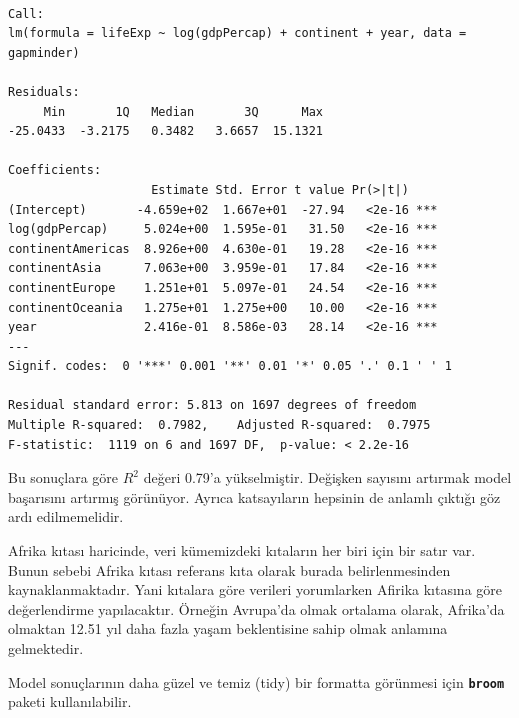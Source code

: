 \documentclass[
  letterpaper,
  DIV=11,
  numbers=noendperiod]{scrreprt}
\begin{document}
\begin{verbatim}

Call:
lm(formula = lifeExp ~ log(gdpPercap) + continent + year, data = gapminder)

Residuals:
     Min       1Q   Median       3Q      Max 
-25.0433  -3.2175   0.3482   3.6657  15.1321 

Coefficients:
                    Estimate Std. Error t value Pr(>|t|)    
(Intercept)       -4.659e+02  1.667e+01  -27.94   <2e-16 ***
log(gdpPercap)     5.024e+00  1.595e-01   31.50   <2e-16 ***
continentAmericas  8.926e+00  4.630e-01   19.28   <2e-16 ***
continentAsia      7.063e+00  3.959e-01   17.84   <2e-16 ***
continentEurope    1.251e+01  5.097e-01   24.54   <2e-16 ***
continentOceania   1.275e+01  1.275e+00   10.00   <2e-16 ***
year               2.416e-01  8.586e-03   28.14   <2e-16 ***
---
Signif. codes:  0 '***' 0.001 '**' 0.01 '*' 0.05 '.' 0.1 ' ' 1

Residual standard error: 5.813 on 1697 degrees of freedom
Multiple R-squared:  0.7982,    Adjusted R-squared:  0.7975 
F-statistic:  1119 on 6 and 1697 DF,  p-value: < 2.2e-16
\end{verbatim}

\begin{tcolorbox}[enhanced jigsaw, colback=white, coltitle=black, colbacktitle=quarto-callout-note-color!10!white, opacitybacktitle=0.6, opacityback=0, toprule=.15mm, bottomrule=.15mm, bottomtitle=1mm, rightrule=.15mm, breakable, arc=.35mm, colframe=quarto-callout-note-color-frame, titlerule=0mm, left=2mm, leftrule=.75mm, toptitle=1mm, title=\textcolor{quarto-callout-note-color}{\faInfo}\hspace{0.5em}{Yorum}]

Bu sonuçlara göre \(R^2\) değeri 0.79'a yükselmiştir. Değişken sayısını
artırmak model başarısını artırmış görünüyor. Ayrıca katsayıların
hepsinin de anlamlı çıktığı göz ardı edilmemelidir.

Afrika kıtası haricinde, veri kümemizdeki kıtaların her biri için bir
satır var. Bunun sebebi Afrika kıtası referans kıta olarak burada
belirlenmesinden kaynaklanmaktadır. Yani kıtalara göre verileri
yorumlarken Afirika kıtasına göre değerlendirme yapılacaktır. Örneğin
Avrupa'da olmak ortalama olarak, Afrika'da olmaktan 12.51 yıl daha fazla
yaşam beklentisine sahip olmak anlamına gelmektedir.

\end{tcolorbox}

\begin{tcolorbox}[enhanced jigsaw, colback=white, coltitle=black, colbacktitle=quarto-callout-tip-color!10!white, opacitybacktitle=0.6, opacityback=0, toprule=.15mm, bottomrule=.15mm, bottomtitle=1mm, rightrule=.15mm, breakable, arc=.35mm, colframe=quarto-callout-tip-color-frame, titlerule=0mm, left=2mm, leftrule=.75mm, toptitle=1mm, title=\textcolor{quarto-callout-tip-color}{\faLightbulb}\hspace{0.5em}{Tavsiye}]

Model sonuçlarının daha güzel ve temiz (tidy) bir formatta görünmesi
için \textbf{\texttt{broom}} paketi kullanılabilir.

\end{tcolorbox}
\end{document}
